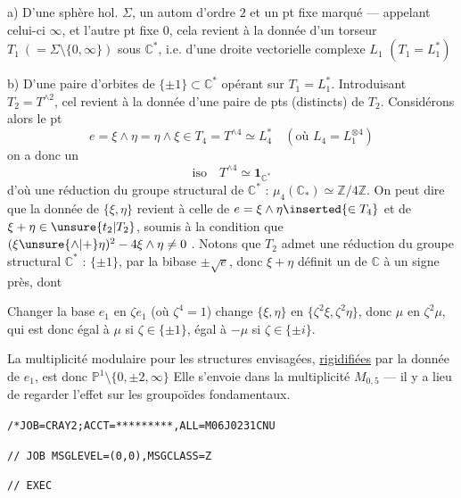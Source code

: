 a) D'une sphère hol. $\Sigma$, un autom \inserted{$\sigma$} d'ordre $2$
et un pt fixe marqué --- appelant celui-ci $\infty$, et l'autre pt fixe $0$,
cela revient à la donnée d'un torseur $T_1\ (= \Sigma\setminus\{0,\infty\})$
sous $\mathbb C^*$, i.e. d'une droite vectorielle complexe $L_1$
$(T_1=L_1^*)$

b) D'une paire d'orbites  de
$\{\pm1\}\subset\mathbb C^*$ opérant sur $T_1=L_1^*$.
Introduisant $T_2=T^{\wedge2}$, cel revient à la donnée d'une paire de pts
\inserted{$\{\xi,\eta\}$} (distincts) de $T_2$.
Considérons alors le pt
\[
 e=\xi\wedge\eta=\eta\wedge\xi
 \in T_4=T^{\wedge4}\simeq L_4^*
 \quad(\text{où }L_4=L_1^{\otimes4})
\]
on a donc un
\[
 \mathrm{iso}\quad T^{\wedge4}\simeq\mathbf1_{\mathbb C^*}
\]
d'où une réduction du groupe structural 
de $\mathbb C^*$ : $\mu_4(\mathbb C_*)\simeq\mathbb Z/4\mathbb Z$.
On peut dire que la donnée de $\{\xi,\eta\}$ revient à celle de
$e=\xi\wedge\eta\inserted{\in T_4}$ et de
$\xi+\eta\in\unsure{t_2|T_2}$, soumis à la condition que
$(\xi\unsure{\wedge|+}\eta)^2-4\xi\wedge\eta\ne0$ .
Notons 
que $T_2$ admet une réduction du groupe structural $\mathbb C^*$ :
$\{\pm1\}$, par la bibase $\pm\sqrt e$, donc $\xi+\eta$
définit un  de $\mathbb C$ à un signe près, dont


Changer la base  \(e_1\) en \(\zeta e_1\) (où \(\zeta^4=1\))
 change 
\(\{\xi,\eta\}\) en \(\{\zeta^2\xi,\zeta^2\eta\}\),
donc \(\mu\) en \(\zeta^2\mu\), qui est donc
égal à \(\mu\) si \(\zeta\in\{\pm1\}\), égal à \(-\mu\) si
\(\zeta\in\{\pm i\}\).

La multiplicité modulaire pour les
structures envisagées, \uline{rigidifiées} par la
donnée de \(e_1\), est donc \(\mathbb P^1\setminus\{0,\pm2,\infty\}\)
Elle s'envoie dans la multiplicité
\(M_{0,5}\) --- il y a lieu de regarder l'effet
sur les groupoïdes fondamentaux.


\texttt{/*JOB=CRAY2;ACCT=*********,ALL=M06}\qquad\texttt{J0231CNU}

\texttt{// JOB MSGLEVEL=(0,0),MSGCLASS=Z}

\texttt{// EXEC }

